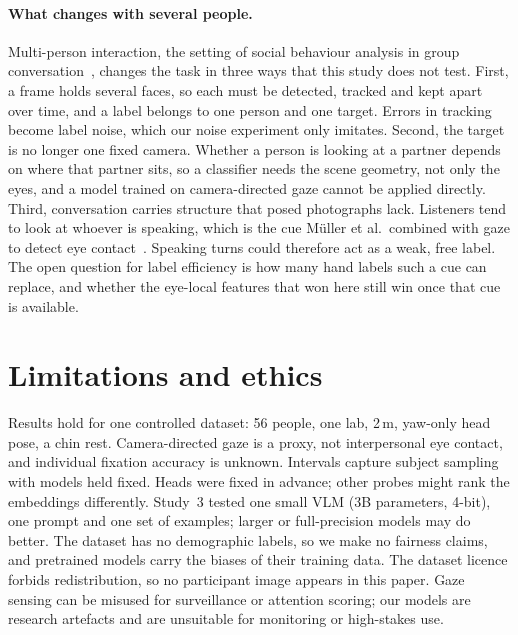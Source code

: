 \documentclass[10pt,twocolumn]{article}
\begin{document}
\paragraph{What changes with several people.}
Multi-person interaction, the setting of social behaviour analysis in group conversation~\cite{muller2018robust,muller2021multimediate}, changes the task in three ways that this study does not test. First, a frame holds several faces, so each must be detected, tracked and kept apart over time, and a label belongs to one person and one target. Errors in tracking become label noise, which our noise experiment only imitates. Second, the target is no longer one fixed camera. Whether a person is looking at a partner depends on where that partner sits, so a classifier needs the scene geometry, not only the eyes, and a model trained on camera-directed gaze cannot be applied directly. Third, conversation carries structure that posed photographs lack. Listeners tend to look at whoever is speaking, which is the cue M\"uller et al.\ combined with gaze to detect eye contact~\cite{muller2018robust}. Speaking turns could therefore act as a weak, free label. The open question for label efficiency is how many hand labels such a cue can replace, and whether the eye-local features that won here still win once that cue is available.

\section{Limitations and ethics}
Results hold for one controlled dataset: 56 people, one lab, 2\,m, yaw-only head pose, a chin rest. Camera-directed
gaze is a proxy, not interpersonal eye contact, and individual fixation accuracy is unknown. Intervals capture
subject sampling with models held fixed. Heads were fixed in advance; other probes might rank the embeddings
differently. Study~3 tested one small VLM (3B parameters, 4-bit), one prompt and one set of examples; larger or full-precision models may do better. The dataset has no demographic labels, so we make no fairness claims, and pretrained models carry the
biases of their training data. The dataset licence forbids redistribution, so no participant image appears in this
paper. Gaze sensing can be misused for surveillance or attention scoring; our models are research artefacts and are
unsuitable for monitoring or high-stakes use.
\end{document}
